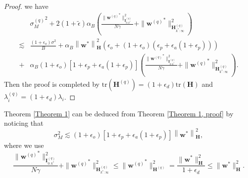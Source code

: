 \documentclass[11pt, letterpaper]{article}
\begin{document}
\begin{proof}
    we have
    \begin{equation*}
        \begin{aligned}
            &{\sigma_M^{(q)}}^2+2(1+\tilde{\epsilon})\alpha_B\left(\frac{\|{\mathbf{w}^{(q)}}^*\|_{\mathbf{I}_{0:k^*}^{(q)}}^2}{N\gamma}+\|{\mathbf{w}^{(q)}}^*\|_{\mathbf{H}_{k^*:\infty}^{(q)}}^2\right)\\
            \lesssim&\frac{(1+\epsilon_o)\sigma^2}{B}+\alpha_B\left\|\mathbf{w}^*\right\|_\mathbf{H}^2\left(\epsilon_o+(1+\epsilon_o)(\epsilon_p+\epsilon_a(1+\epsilon_p)) \right)\\
            +&\alpha_B(1+\epsilon_o)[1+\epsilon_p+\epsilon_a(1+\epsilon_p)]\left(\frac{\|{\mathbf{w}^{(q)}}^*\|_{\mathbf{I}_{0:k^*}^{(q)}}^2}{N\gamma}+\|{\mathbf{w}^{(q)}}^*\|_{\mathbf{H}_{k^*:\infty}^{(q)}}^2\right).
        \end{aligned}
    \end{equation*}
    Then the proof is completed by $\mathrm{tr}(\mathbf{H}^{(q)})=(1+\epsilon_d)\mathrm{tr}(\mathbf{H})$ and $\lambda_i^{(q)}=(1+\epsilon_d)\lambda_i$.
\end{proof}
Theorem \ref{Theorem 1} can be deduced from Theorem \ref{Theorem 1, proof} by noticing that
\begin{equation*}
    \sigma_M^2\lesssim (1+\epsilon_o)[1+\epsilon_p+\epsilon_a(1+\epsilon_p)]\left\|\mathbf{w}^*\right\|_\mathbf{H}^2,
\end{equation*}
where we use
\begin{equation*}
    \frac{\|{\mathbf{w}^{(q)}}^*\|_{\mathbf{I}_{0:k^*}^{(q)}}^2}{N\gamma}+\|{\mathbf{w}^{(q)}}^*\|_{\mathbf{H}_{k^*:\infty}^{(q)}}^2\leq \|{\mathbf{w}^{(q)}}^*\|_{\mathbf{H}^{(q)}}^2=\frac{\|\mathbf{w}^*\|_\mathbf{H}^2}{1+\epsilon_d}\leq\|\mathbf{w}^*\|_\mathbf{H}^2.
\end{equation*}
\end{document}
